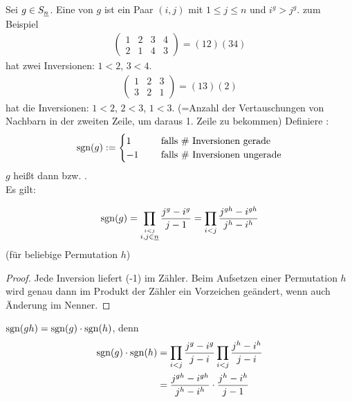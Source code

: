 \begin{definition}
	Sei $g \in S_{\underline{n}}$. Eine  von $g$ ist ein Paar $(i,j)$ mit $1\le j \le n$ und $i^g > j^g$. zum Beispiel
	\begin{align*}
		\begin{pmatrix}
			1 & 2 & 3 & 4\\
			2 & 1 & 4 & 3
		\end{pmatrix} = (12)(34)
	\end{align*}
	hat zwei Inversionen: $1 < 2$, $3 < 4$.
	\begin{align*}
		\begin{pmatrix}
			1 & 2 & 3\\
			3 & 2 & 1
		\end{pmatrix} = (13)(2)
	\end{align*}
	hat die Inversionen: $1 < 2$, $2 < 3$, $1 < 3$.
	(=Anzahl der Vertauschungen von Nachbarn in der zweiten Zeile, um daraus 1. Zeile zu bekommen)
	Definiere :
	\begin{align*}
		\operatorname{sgn}(g) := \begin{cases}
			1 &\quad \text{ falls \# Inversionen gerade}\\
			-1 &\quad \text{ falls \# Inversionen ungerade}\\
		\end{cases}
	\end{align*}
	$g$ heißt dann  bzw. .\\
	Es gilt:
	\begin{defenum}
		\item \begin{align*}
			\operatorname{sgn}(g) = \prod_{\stackrel{i<j}{i,j \in \underline{n}}} \frac{j^g - i^g}{j-1} = \prod_{i<j} \frac{j^{gh}-i^{gh}}{j^h - i^h}
		\end{align*}
		(für beliebige Permutation $h$)
		\begin{proof}
			Jede Inversion liefert (-1) im Zähler. Beim Aufsetzen einer Permutation $h$ wird genau dann im Produkt der Zähler ein Vorzeichen geändert, wenn auch Änderung im Nenner.
		\end{proof}
		\item $\operatorname{sgn}(gh) = \operatorname{sgn}(g) \cdot \operatorname{sgn}(h)$, denn
		\begin{align*}
			\sgn(g)\cdot \sgn(h) &= \prod_{i<j}\frac{j^g-i^g}{j-i}\prod_{i<j}\frac{j^h - i^h}{j-i}\\
			&= \frac{j^{gh} - i^{gh}}{j^h - i^h} \cdot \frac{j^h - i^h}{j-1}\\

\end{align*}
\end{defenum}
\end{definition}
